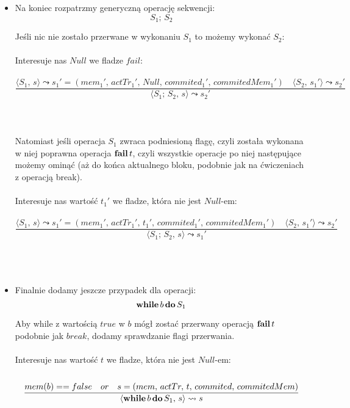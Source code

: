 \documentclass{article}
\begin{document}
\begin{itemize}
      \item
      Na koniec rozpatrzmy generyczną operację sekwencji:
      \[
         S_1; \, S_2
      \]

      Jeśli nic nie zostało przerwane w wykonaniu $S_1$ to możemy wykonać $S_2$:
      \\ \\
      Interesuje nas $Null$ we fladze $fail$:
      \\ \\
      \[
         \frac {
            \langle S_1, \, s \rangle
            \leadsto s_1' = (mem_1', \, actTr_1', \, Null, \, commited_1', \, commitedMem_1')
            \quad
            \langle S_2, \, s_1' \rangle
            \leadsto s_2'
         } {
            \langle S_1; \, S_2, \, s \rangle
            \leadsto s_2'
         }
      \]
      \\ \\ \\
      Natomiast jeśli operacja $S_1$ zwraca podniesioną flagę, czyli została wykonana w niej poprawna operacja
      ${\bf fail} \, t$, czyli wszystkie operacje po niej następujące możemy ominąć
      (aż do końca aktualnego bloku, podobnie jak na ćwiczeniach z operacją break).
      \\ \\
      Interesuje nas wartość $t_1'$ we fladze, która nie jest $Null$-em:
      \\ \\
      \[
         \frac {
            \langle S_1, \, s \rangle
            \leadsto s_1' = (mem_1', \, actTr_1', \, t_1', \, commited_1', \, commitedMem_1')
            \quad
            \langle S_2, \, s_1' \rangle
            \leadsto s_2'
         } {
            \langle S_1; \, S_2, \, s \rangle
            \leadsto s_1'
         }
      \]
      \\ \\ \\

      \item
      Finalnie dodamy jeszcze przypadek dla operacji:
      \[
            {\bf while} \, b \, {\bf do} \, S_1
      \]

      Aby while z wartością $true$ w $b$ mógł zostać przerwany operacją ${\bf fail} \, t$ podobnie jak $break$,
      dodamy sprawdzanie flagi przerwania.
      \\ \\
      Interesuje nas wartość $t$ we fladze, która nie jest $Null$-em:
      \\ \\
      \[
         \frac {
            mem(b) == false \quad or \quad s = (mem, \, actTr, \, t, \, commited, \, commitedMem)
         } {
            \langle {\bf while} \, b \, {\bf do} \, S_1, \, s \rangle
            \leadsto s
         }
      \]

   \end{itemize}
\end{document}
